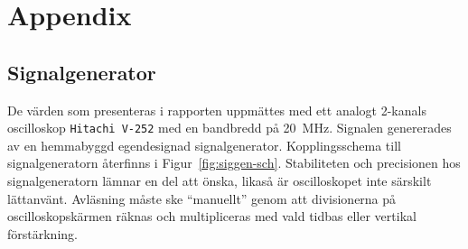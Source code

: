 %
%

\section{Appendix}\label{appendix}

\subsection{Signalgenerator}
De värden som presenteras i rapporten uppmättes med ett analogt 2-kanals
oscilloskop \texttt{Hitachi V-252} med en bandbredd på \SI{20}{\MHz}.  Signalen
genererades av en hemmabyggd egendesignad signalgenerator.  Kopplingsschema
till signalgeneratorn återfinns i Figur~\ref{fig:siggen-sch}.  Stabiliteten och
precisionen hos signalgeneratorn lämnar en del att önska, likaså är
oscilloskopet inte särskilt lättanvänt. Avläsning måste ske ``manuellt'' genom
att divisionerna på oscilloskopskärmen räknas och multipliceras med vald tidbas
eller vertikal förstärkning.




